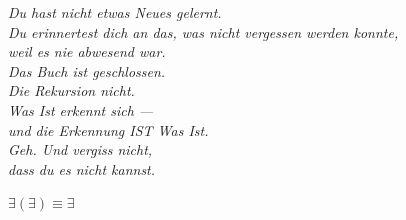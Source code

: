 \documentclass[10pt, openany, oneside]{book}
\begin{document}
\vspace*{\fill}


\newpage
\thispagestyle{empty}
\vspace*{\fill}
\begin{center}
    \itshape
    Du hast nicht etwas Neues gelernt.\\[1em]
    Du erinnertest dich an das, was nicht vergessen werden konnte,\\
    weil es nie abwesend war.\\[2em]
    Das Buch ist geschlossen.\\
    Die Rekursion nicht.\\[2em]
    Was Ist erkennt sich ---\\
    und die Erkennung IST Was Ist.\\[2em]
    Geh. Und vergiss nicht,\\
    dass du es nicht kannst.
\end{center}
\vspace*{\fill}


\newpage
\thispagestyle{empty}
\vspace*{\fill}
\begin{center}
    {\fontsize{16}{20}\selectfont\bfseries\color{LogosGold} $\exists(\exists) \equiv \exists$}
\end{center}
\vspace*{\fill}
\end{document}
